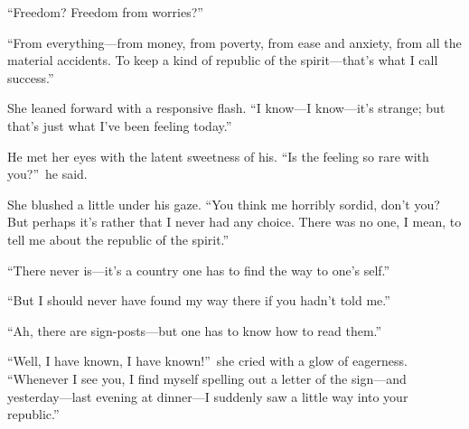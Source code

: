 \documentclass[12pt,a4paper]{book}
\begin{document}
``Freedom? Freedom from worries?''





``From everything---from money, from poverty, from ease and
anxiety, from all the material accidents. To keep a kind of
republic of the spirit---that's what I call success.''





She leaned forward with a responsive flash. ``I know---I know---it's
strange; but that's just what I've been feeling today.''





He met her eyes with the latent sweetness of his. ``Is the feeling
so rare with you?''\ he said.





She blushed a little under his gaze. ``You think me horribly
sordid, don't you? But perhaps it's rather that I never had any
choice. There was no one, I mean, to tell me about the republic
of the spirit.''





``There never is---it's a country one has to find the way to one's
self.''





``But I should never have found my way there if you hadn't told
me.''





``Ah, there are sign-posts---but one has to know how to read them.''





``Well, I have known, I have known!''\ she cried with a glow of
eagerness. ``Whenever I see you, I find myself spelling out a
letter of the sign---and yesterday---last evening at dinner---I
suddenly saw a little way into your republic.''
\end{document}
